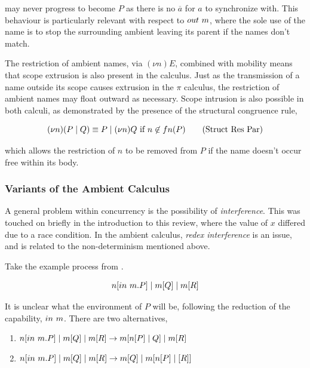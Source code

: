 \noindent may never progress to become $P$ as there is no $\overline{a}$
for $a$ to synchronize with.  This behaviour is particularly relevant
with respect to $out\ m$, where the sole use of the name is to stop
the surrounding ambient leaving its parent if the names don't match.

The restriction of ambient names, via $(\nu n) E$, combined with
mobility means that scope extrusion is also present in the calculus.
Just as the transmission of a name outside its scope causes extrusion
in the $\pi$ calculus, the restriction of ambient names may float
outward as necessary.  Scope intrusion is also possible in both
calculi, as demonstrated by the presence of the structural congruence
rule,

\begin{equation}
(\nu n)(P \pc Q) \equiv P \pc (\nu n) Q\ \text{if}\ n \not \in fn(P) \tag{Struct Res Par}
\end{equation}

\noindent which allows the restriction of $n$ to be removed from $P$
if the name doesn't occur free within its body.

\subsubsection{Variants of the Ambient Calculus}
\label{ambvariants}

A general problem within concurrency is the possibility of
\emph{interference}.  This was touched on briefly in the introduction
to this review, where the value of $x$ differed due to a race
condition.  In the ambient calculus, \emph{redex interference}
\cite{sangiorgi:mobsafeambients} is an issue, and is related to the
non-determinism mentioned above.

Take the example process from \cite{sangiorgi:mobsafeambients}.

\begin{equation}
n[in\ m.P] \;|\; m[Q] \;|\; m[R]
\end{equation}

\noindent It is unclear what the environment of $P$ will be, following
the reduction of the capability, $in\ m$.  There are two
alternatives,

\begin{enumerate}
\item $n[in\ m.P] \;|\; m[Q] \;|\; m[R] \rightarrow m[n[P] \;|\; Q] \;|\; m[R]$
\item $n[in\ m.P] \;|\; m[Q] \;|\; m[R] \rightarrow m[Q] \;|\; m[n[P] \;|\; [R]]$
\end{enumerate}

